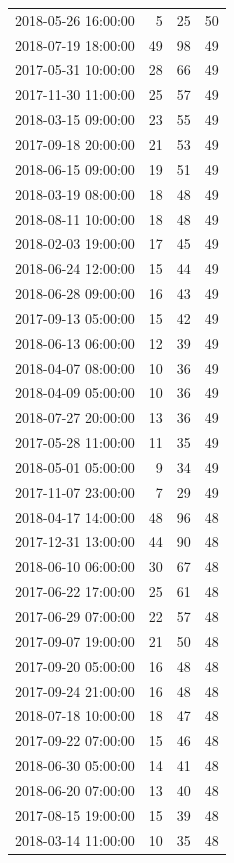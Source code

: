 \begin{tabular}{lrrr}
2018-05-26 16:00:00 & 5 & 25 & 50 \\
2018-07-19 18:00:00 & 49 & 98 & 49 \\
2017-05-31 10:00:00 & 28 & 66 & 49 \\
2017-11-30 11:00:00 & 25 & 57 & 49 \\
2018-03-15 09:00:00 & 23 & 55 & 49 \\
2017-09-18 20:00:00 & 21 & 53 & 49 \\
2018-06-15 09:00:00 & 19 & 51 & 49 \\
2018-03-19 08:00:00 & 18 & 48 & 49 \\
2018-08-11 10:00:00 & 18 & 48 & 49 \\
2018-02-03 19:00:00 & 17 & 45 & 49 \\
2018-06-24 12:00:00 & 15 & 44 & 49 \\
2018-06-28 09:00:00 & 16 & 43 & 49 \\
2017-09-13 05:00:00 & 15 & 42 & 49 \\
2018-06-13 06:00:00 & 12 & 39 & 49 \\
2018-04-07 08:00:00 & 10 & 36 & 49 \\
2018-04-09 05:00:00 & 10 & 36 & 49 \\
2018-07-27 20:00:00 & 13 & 36 & 49 \\
2017-05-28 11:00:00 & 11 & 35 & 49 \\
2018-05-01 05:00:00 & 9 & 34 & 49 \\
2017-11-07 23:00:00 & 7 & 29 & 49 \\
2018-04-17 14:00:00 & 48 & 96 & 48 \\
2017-12-31 13:00:00 & 44 & 90 & 48 \\
2018-06-10 06:00:00 & 30 & 67 & 48 \\
2017-06-22 17:00:00 & 25 & 61 & 48 \\
2017-06-29 07:00:00 & 22 & 57 & 48 \\
2017-09-07 19:00:00 & 21 & 50 & 48 \\
2017-09-20 05:00:00 & 16 & 48 & 48 \\
2017-09-24 21:00:00 & 16 & 48 & 48 \\
2018-07-18 10:00:00 & 18 & 47 & 48 \\
2017-09-22 07:00:00 & 15 & 46 & 48 \\
2018-06-30 05:00:00 & 14 & 41 & 48 \\
2018-06-20 07:00:00 & 13 & 40 & 48 \\
2017-08-15 19:00:00 & 15 & 39 & 48 \\
2018-03-14 11:00:00 & 10 & 35 & 48 \\

\end{tabular}
